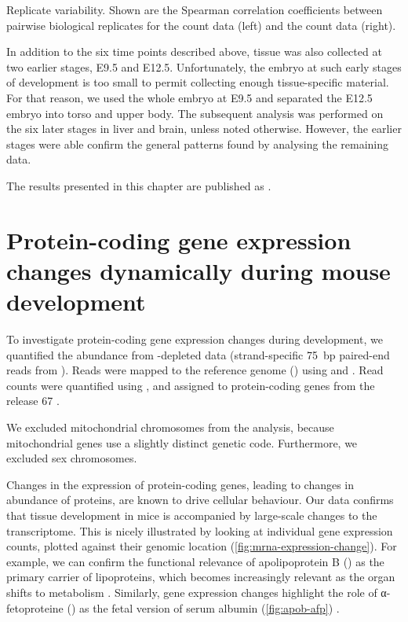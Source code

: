     {Replicate variability.}
    {Shown are the Spearman correlation coefficients between pairwise biological
    replicates for the \trna count data (left) and the \mrna count data (right).}

In addition to the six time points described above, tissue was also collected at
two earlier stages, E9.5 and E12.5. Unfortunately, the embryo at such early
stages of development is too small to permit collecting enough tissue-specific
material. For that reason, we used the whole embryo at E9.5 and separated the
E12.5 embryo into torso and upper body. The subsequent analysis was performed on
the six later stages in liver and brain, unless noted otherwise. However, the earlier stages were able confirm the general
patterns found by analysing the remaining data.

The results presented in this chapter are published as \citet{Schmitt:2014}.


\section{Protein-coding gene expression changes dynamically during mouse
development}

To investigate protein-coding gene expression changes during development, we
quantified the \mrna abundance from \rrna-depleted \rnaseq data (strand-specific
\SI{75}{bp} paired-end reads from  ). Reads were
mapped to the \mmu reference genome () using 
\citep{Fonseca:2014} and  \citep{Kim:2013}. Read counts were
quantified using  \citep{Anders:2014}, and assigned to
protein-coding genes from the  release \num{67}
\citep{Flicek:2014}.

We excluded mitochondrial chromosomes from the analysis, because mitochondrial
genes use a slightly distinct genetic code\todo[ref]{}. Furthermore, we excluded
sex chromosomes.

Changes in the expression of protein-coding genes, leading to changes in
abundance of proteins, are known to drive cellular behaviour\todo[ref]{}. Our
data confirms that tissue development in mice is accompanied by large-scale
changes to the \mrna transcriptome. This is nicely illustrated by looking at
individual gene expression counts, plotted against their genomic location
(\cref{fig:mrna-expression-change}). For example, we can confirm the functional
relevance of apolipoprotein B () as the primary carrier of
lipoproteins, which becomes increasingly relevant as the organ shifts to
metabolism \citep{Knott:1986}. Similarly, \mrna gene expression changes
highlight the role of α-fetoproteine () as the fetal version of
serum albumin (\cref{fig:apob-afp}) \citep{Chen:1997}.

